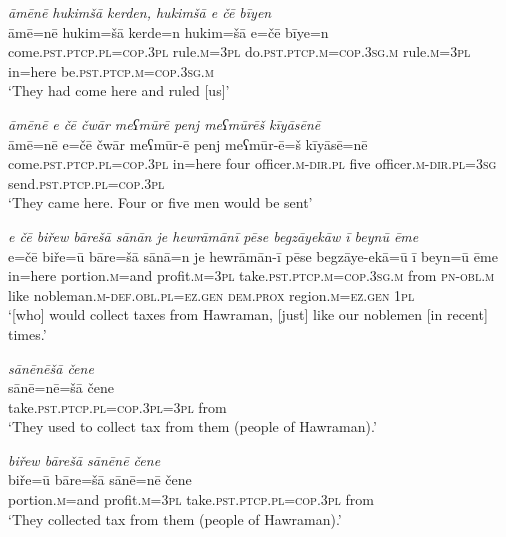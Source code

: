 \ea \label{BP.22}
\textit{āmēnē hukimšā kerden, hukimšā e čē bīyen} \\ 
\gll āmē=nē hukim=šā kerde=n hukim=šā e=čē bīye=n \\ 
 come\textsc{.pst}\textsc{.ptcp}\textsc{.pl}\textsc{=cop}\textsc{.3pl} rule\textsc{.m}\textsc{=3pl} do\textsc{.pst}\textsc{.ptcp}\textsc{.m}\textsc{=cop}\textsc{.3sg}\textsc{.m} rule\textsc{.m}\textsc{=3pl} in=here be\textsc{.pst}\textsc{.ptcp}\textsc{.m}\textsc{=cop}\textsc{.3sg}\textsc{.m} \\ 
\glt `They had come here and ruled [us]'
\z 
 
\ea \label{BP.23}
\textit{āmēnē e čē čwār meʕmūrē penj meʕmūrēš kīyāsēnē} \\ 
\gll āmē=nē e=čē čwār meʕmūr-ē penj meʕmūr-ē=š kīyāsē=nē \\ 
 come\textsc{.pst}\textsc{.ptcp}\textsc{.pl}\textsc{=cop}\textsc{.3pl} in=here four officer\textsc{.m}\textsc{-dir}\textsc{.pl} five officer\textsc{.m}\textsc{-dir}\textsc{.pl}\textsc{=3sg} send\textsc{.pst}\textsc{.ptcp}\textsc{.pl}\textsc{=cop}\textsc{.3pl} \\ 
\glt `They came here. Four or five men would be sent'
\z 
 
\ea \label{BP.24}
\textit{e čē biřew bārešā sānān je hewrāmānī pēse begzāyekāw ī beynū ēme} \\ 
\gll e=čē biře=ū bāre=šā sānā=n je hewrāmān-ī pēse begzāye-ekā=ū ī beyn=ū ēme \\ 
 in=here portion\textsc{.m}=and profit\textsc{.m}\textsc{=3pl} take\textsc{.pst}\textsc{.ptcp}\textsc{.m}\textsc{=cop}\textsc{.3sg}\textsc{.m} from \textsc{pn}\textsc{-obl}\textsc{.m} like nobleman\textsc{.m}\textsc{-def}\textsc{.obl}\textsc{.pl}\textsc{=ez.gen} \textsc{dem.prox} region\textsc{.m}\textsc{=ez.gen} \textsc{1pl} \\ 
\glt `[who] would collect taxes from Hawraman, [just] like our noblemen [in recent] times.'
\z 
 
\ea \label{BP.25}
\textit{sānēnēšā čene} \\ 
\gll sānē=nē=šā čene \\ 
 take\textsc{.pst}\textsc{.ptcp}\textsc{.pl}\textsc{=cop}\textsc{.3pl}\textsc{=3pl} from \\ 
\glt `They used to collect tax from them (people of Hawraman).'
\z 
 
\ea \label{BP.26}
\textit{biřew bārešā sānēnē čene} \\ 
\gll biře=ū bāre=šā sānē=nē čene \\ 
 portion\textsc{.m}=and profit\textsc{.m}\textsc{=3pl} take\textsc{.pst}\textsc{.ptcp}\textsc{.pl}\textsc{=cop}\textsc{.3pl} from \\ 
\glt `They collected tax from them (people of Hawraman).'
\z 
 
